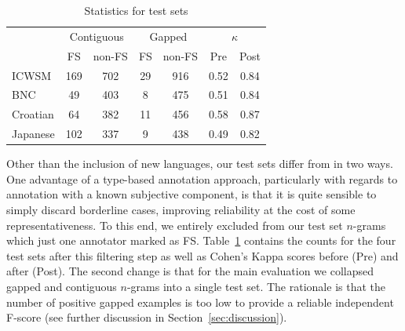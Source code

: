 \documentclass[11pt,letterpaper]{article}
\newcommand{\z}{\phantom{0}}
\newcommand{\tabref}[2][]{Table#1~\ref{#2}\xspace}
\newcommand{\secref}[2][]{Section#1~\ref{#2}\xspace}
\begin{document}
\begin{table}[!bt]
 
 \begin{center}
	 \begin{tabular}{@{}lc@{\,\,\,}cc@{\,\,\,}cc@{\,\,\,}c@{}}

       \toprule
       & \multicolumn{2}{c}{Contiguous} & \multicolumn{2}{c}{Gapped} & \multicolumn{2}{c}{$\kappa$} \\ %
       \cmidrule(lr){2-3}\cmidrule(lr){4-5}\cmidrule(lr){6-7}
			& FS & non-FS & FS & non-FS & Pre & Post \\
			 \midrule
			ICWSM    & 169  & 702 & 29 & 916 &0.52 &0.84 \\
			BNC      & \z49 & 403 & \z8& 475 &0.51 &0.84 \\
			Croatian & \z64 & 382 & 11 & 456 & 0.58 &0.87 \\
			Japanese & 102  & 337 & \z9 & 438 & 0.49 &0.82\\
       \bottomrule
 \end{tabular}
  \caption{ Statistics for test sets }
	 \label{tab:stats}

 \end{center}

 \end{table}

Other than the inclusion of new languages, our test sets differ from  in two ways. One advantage of a type-based annotation approach, particularly with regards to annotation with a known subjective component, is that it is quite sensible to simply discard borderline cases, improving reliability at the cost of some representativeness. To this end, we entirely excluded from our test set $n$-grams which just one annotator marked as FS. \tabref{tab:stats} contains the counts for the four test sets after this filtering step as well as Cohen's Kappa scores before (Pre) and after (Post).  The second change is that for the main evaluation we collapsed gapped and contiguous $n$-grams into a single test set. The rationale is that the number of positive gapped examples is too low to provide a reliable independent F-score (see further discussion in \secref{sec:discussion}). 
\end{document}
